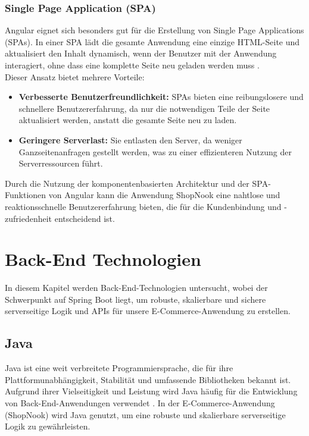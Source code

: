 \subsubsection{Single Page Application (SPA)}

Angular eignet sich besonders gut für die Erstellung von Single Page Applications (SPAs). In einer SPA lädt die gesamte Anwendung eine einzige HTML-Seite und aktualisiert den Inhalt dynamisch, wenn der Benutzer mit der Anwendung interagiert, ohne dass eine komplette Seite neu geladen werden muss \cite{Angular3:2024}. \\
Dieser Ansatz bietet mehrere Vorteile:
\begin{itemize}
	\item \textbf{Verbesserte Benutzerfreundlichkeit:} SPAs bieten eine reibungslosere und schnellere Benutzererfahrung, da nur die notwendigen Teile der Seite aktualisiert werden, anstatt die gesamte Seite neu zu laden.
	\item \textbf{Geringere Serverlast:} Sie entlasten den Server, da weniger Ganzseitenanfragen gestellt werden, was zu einer effizienteren Nutzung der Serverressourcen führt.
\end{itemize}

Durch die Nutzung der komponentenbasierten Architektur und der SPA-Funktionen von Angular kann die Anwendung ShopNook eine nahtlose und reaktionsschnelle Benutzererfahrung bieten, die für die Kundenbindung und -zufriedenheit entscheidend ist.


\section{Back-End Technologien}

In diesem Kapitel werden Back-End-Technologien untersucht, wobei der Schwerpunkt auf Spring Boot liegt, um robuste, skalierbare und sichere serverseitige Logik und APIs für unsere E-Commerce-Anwendung zu erstellen.

\subsection{Java}

Java ist eine weit verbreitete Programmiersprache, die für ihre Plattformunabhängigkeit, Stabilität und umfassende Bibliotheken bekannt ist. Aufgrund ihrer Vielseitigkeit und Leistung wird Java häufig für die Entwicklung von Back-End-Anwendungen verwendet \cite{Java:2024}. In der E-Commerce-Anwendung (ShopNook) wird Java genutzt, um eine robuste und skalierbare serverseitige Logik zu gewährleisten.

